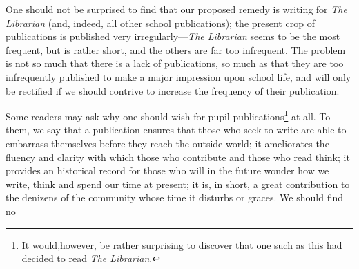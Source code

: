 One should not be surprised to find that our proposed remedy is writing for
\textit{The Librarian} (and, indeed, all other school publications); the present
crop of publications is published very irregularly---\textit{The Librarian}
seems to be the most frequent, but is rather short, and the others are far too
infrequent. The problem is not so much that there is a lack of publications, so
much as that they are too infrequently published to make a major impression upon
school life, and will only be rectified if we should contrive to increase the frequency of their publication.

Some readers may ask why one should wish for pupil publications\footnote{It
would,however, be rather surprising to discover that one such
as this had decided to read \textit{The Librarian}.} at all. To them, we say that a
publication ensures that those who seek to write are able to embarrass themselves
before they reach the outside world; it ameliorates the fluency and clarity with
which those who contribute and those who read think; it provides an historical
record for those who will in the future wonder how we write, think and spend
our time at present; it is, in short, a great contribution to the denizens of
the community whose time it disturbs or graces. We should find no
